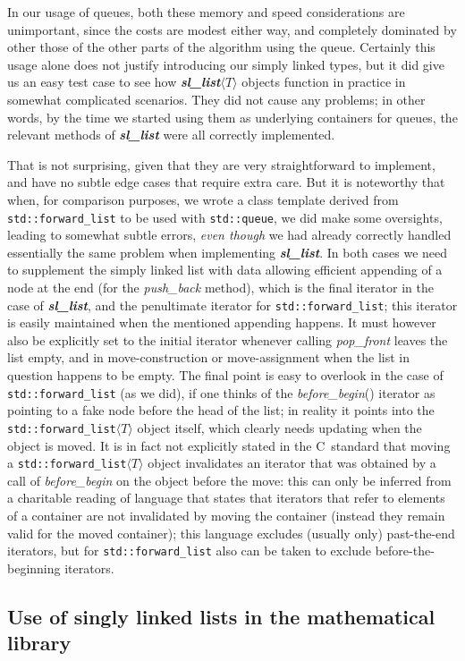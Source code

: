 \documentclass[12pt]{article}
\theoremstyle{plain}
\theoremstyle{definition}
\def\PP{\copy\PPbox}
\newcommand\Cee{\textsc{C}}
\newcommand\Cpp{\Cee\PP}
\newcommand\std[1]{\texttt{std::#1}}
\def\frwl.{\std{forward\_list}}
\def\slls.{\textbf{\textit{sl\_\!list}}}
\def\ang#1{\langle#1\rangle}
\begin{document}
In our usage of queues, both these memory and speed considerations are
unimportant, since the costs are modest either way, and completely dominated by
other those of the other parts of the algorithm using the queue. Certainly this
usage alone does not justify introducing our simply linked types, but it did
give us an easy test case to see how \slls.$\ang{T}$ objects function in
practice in somewhat complicated scenarios. They did not cause any problems; in
other words, by the time we started using them as underlying containers for
queues, the relevant methods of \slls. were all correctly implemented.

That is not surprising, given that they are very straightforward to implement,
and have no subtle edge cases that require extra care. But it is noteworthy that
when, for comparison purposes, we wrote a class template derived from \frwl. to
be used with \std{queue}, we did make some oversights, leading to somewhat
subtle errors, \emph{even though} we had already correctly handled essentially
the same problem when implementing \slls.. In both cases we need to supplement
the simply linked list with data allowing efficient appending of a node at the
end (for the \textit{push\_\!back} method), which is the final iterator in the
case of \slls., and the penultimate iterator for \frwl.; this iterator is easily
maintained when the mentioned appending happens. It must however also be
explicitly set to the initial iterator whenever calling \textit{pop\_\!front}
leaves the list empty, and in move-construction or move-assignment when the list
in question happens to be empty. The final point is easy to overlook in the case
of \frwl. (as we did), if one thinks of the \textit{before\_\!begin}() iterator
as pointing to a fake node before the head of the list; in reality it points
into the \frwl.$\ang{T}$ object itself, which clearly needs updating when the
object is moved. It is in fact not explicitly stated in the \Cpp\ standard that
moving a \frwl.$\ang{T}$ object invalidates an iterator that was obtained by a
call of \textit{before\_\!begin} on the object before the move: this can only be
inferred from a charitable reading of language that states that iterators that
refer to elements of a container are not invalidated by moving the container
(instead they remain valid for the moved container); this language excludes
(usually only) past-the-end iterators, but for \frwl. also can be taken to
exclude before-the-beginning iterators.


\subsection{Use of singly linked lists in the mathematical library}
\end{document}
